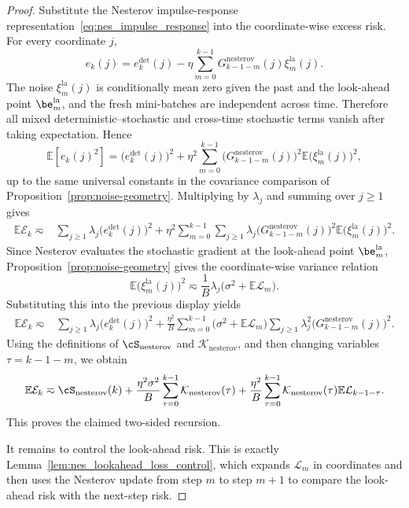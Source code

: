 \documentclass[11pt]{article}
\newcommand{\nesterov}{\mathrm{nesterov}}
\newcommand{\la}{\mathrm{la}}
\begin{document}
\begin{proof}
Substitute the Nesterov impulse-response representation~\eqref{eq:nes_impulse_response} into the coordinate-wise excess risk.  For every coordinate
\(j\),
\[
e_k(j)
    =
    e_k^{\mathrm{det}}(j)
    -\eta\sum_{m=0}^{k-1}G_{k-1-m}^{\nesterov}(j)\xi_m^{\la}(j).
\]
The noise \(\xi_m^{\la}(j)\) is conditionally mean zero given the past and the look-ahead point
\(\be_m^{\la}\), and the fresh mini-batches are independent across time.  Therefore all mixed
deterministic--stochastic and cross-time stochastic terms vanish after taking expectation.  Hence
\[
    \mathbb{E}[e_k(j)^2]
    =
    \bigl(e_k^{\mathrm{det}}(j)\bigr)^2
    +
    \eta^2\sum_{m=0}^{k-1}
    \bigl(G_{k-1-m}^{\nesterov}(j)\bigr)^2
    \mathbb{E}\bigl(\xi_m^{\la}(j)\bigr)^2,
\]
up to the same universal constants in the covariance comparison of Proposition~\ref{prop:noise-geometry}.  Multiplying by
\(\lambda_j\) and summing over \(j\ge1\) gives
\[
\begin{aligned}
    \mathbb{E}\mathcal E_k
    \eqsim{}&
    \sum_{j\ge1}\lambda_j\bigl(e_k^{\mathrm{det}}(j)\bigr)^2
    +\eta^2\sum_{m=0}^{k-1}\sum_{j\ge1}
    \lambda_j
    \bigl(G_{k-1-m}^{\nesterov}(j)\bigr)^2
    \mathbb{E}\bigl(\xi_m^{\la}(j)\bigr)^2 .
\end{aligned}
\]
Since Nesterov evaluates the stochastic gradient at the look-ahead point \(\be_m^{\la}\),
Proposition~\ref{prop:noise-geometry} gives the coordinate-wise variance relation
\[
    \mathbb{E}\bigl(\xi_m^{\la}(j)\bigr)^2
    \eqsim
    \frac{1}{B}\lambda_j\bigl(\sigma^2+\mathbb{E}\mathcal L_m\bigr).
\]
Substituting this into the previous display yields
\[
\begin{aligned}
    \mathbb{E}\mathcal E_k
    \eqsim{}&
    \sum_{j\ge1}\lambda_j\bigl(e_k^{\mathrm{det}}(j)\bigr)^2
    +\frac{\eta^2}{B}\sum_{m=0}^{k-1}
    \bigl(\sigma^2+\mathbb{E}\mathcal L_m\bigr)
    \sum_{j\ge1}\lambda_j^2
    \bigl(G_{k-1-m}^{\nesterov}(j)\bigr)^2 .
\end{aligned}
\]
Using the definitions of \(\cS_{\nesterov}\) and \(\mathcal K_{\nesterov}\), and then changing
variables \(\tau=k-1-m\), we obtain
\[
    \mathbb{E}\mathcal E_k
    \eqsim
    \cS_{\nesterov}(k)
    +
    \frac{\eta^2\sigma^2}{B}\sum_{\tau=0}^{k-1}\mathcal K_{\nesterov}(\tau)
    +
    \frac{\eta^2}{B}\sum_{\tau=0}^{k-1}\mathcal K_{\nesterov}(\tau)
    \mathbb{E}\mathcal L_{k-1-\tau}.
\]
This proves the claimed two-sided recursion.

It remains to control the look-ahead risk.  This is exactly Lemma~\ref{lem:nes_lookahead_loss_control},
which expands \(\mathcal L_m\) in coordinates and then uses the Nesterov update from step \(m\) to step
\(m+1\) to compare the look-ahead risk with the next-step risk.
\end{proof}
\end{document}

